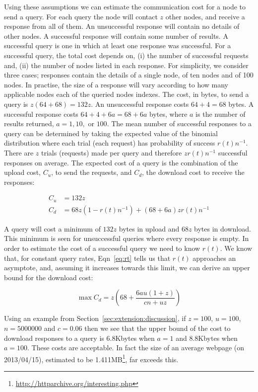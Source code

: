     Using these assumptions we can estimate the communication cost for a node to send a query. For each query the node will contact $z$ other nodes, and receive a response from all of them. An unsuccessful response will contain no details of other nodes. A successful response will contain some number of results. A successful query is one in which at least one response was successful. For a successful query, the total cost depends on, (i) the number of successful requests and, (ii) the number of nodes listed in each response. For simplicity, we consider three cases; responses contain the details of a single node, of ten nodes and of 100 nodes. In practise, the size of a response will vary according to how many applicable nodes each of the queried nodes indexes. The cost, in bytes, to send a query is $z(64+68)=132z$. An unsuccessful response costs $64+4=68$ bytes. A successful response costs $64+4+6a=68+6a$ bytes, where $a$ is the number of results returned, $a=1,10,\textrm{ or }100$. The mean number of successful responses to a query can be determined by taking the expected value of the binomial distribution where each trial (each request) has probability of success $r(t)n^{-1}$. There are $z$ trials (requests) made per query and therefore $zr(t)n^{-1}$ successful responses on average. The expected cost of a query is the combination of the upload cost, $C_u$, to send the requests, and $C_d$, the download cost to receive the responses:

    \begin{align}
        C_u &= 132z\\
        C_d &= 68z(1-r(t)n^{-1}) + (68 + 6a)zr(t)n^{-1}
    \end{align}

    A query will cost a minimum of $132z$ bytes in upload and $68z$ bytes in download. This minimum is seen for unsuccessful queries where every response is empty. In order to estimate the cost of a successful query we need to know $r(t)$. We know that, for constant query rates, Eqn~\ref{eq:rt} tells us that $r(t)$ approaches an asymptote, and, assuming it increases towards this limit, we can derive an upper bound for the download cost:

    \begin{equation}
      \max{C_d} = z(68 + \frac{6au(1+z)}{cn+uz})
    \end{equation}

    Using an example from Section~\ref{sec:extension:discussion}, if $z=100$, $u=100$, $n=5000000$ and $c=0.06$ then we see that the upper bound of the cost to download responses to a query is 6.8Kbytes when $a=1$ and 8.8Kbytes when $a=100$. These costs are acceptable. In fact the size of an average webpage (on 2013/04/15), estimated to be 1.411MB\footnote{\url{http://httparchive.org/interesting.php}}, far exceeds this.

